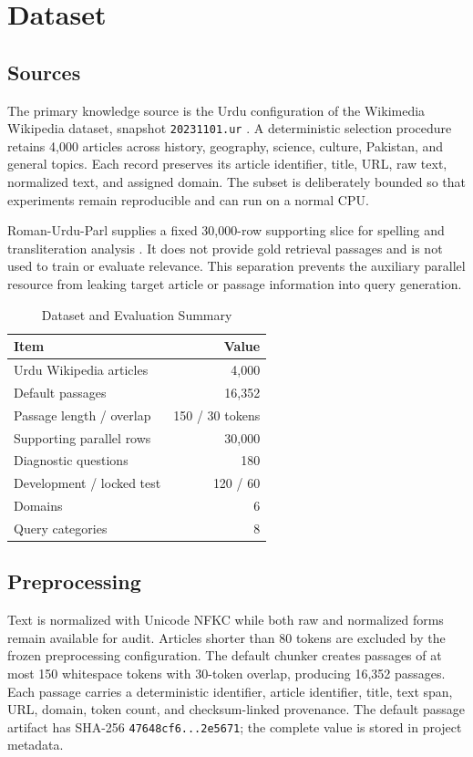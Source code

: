 \documentclass[conference]{IEEEtran}
\begin{document}
\section{Dataset}
\subsection{Sources}
The primary knowledge source is the Urdu configuration of the Wikimedia Wikipedia dataset, snapshot \texttt{20231101.ur} \cite{wikimedia2023urdu}. A deterministic selection procedure retains 4,000 articles across history, geography, science, culture, Pakistan, and general topics. Each record preserves its article identifier, title, URL, raw text, normalized text, and assigned domain. The subset is deliberately bounded so that experiments remain reproducible and can run on a normal CPU.

Roman-Urdu-Parl supplies a fixed 30,000-row supporting slice for spelling and transliteration analysis \cite{alam2022parallel}. It does not provide gold retrieval passages and is not used to train or evaluate relevance. This separation prevents the auxiliary parallel resource from leaking target article or passage information into query generation.

\begin{table}[t]
\caption{Dataset and Evaluation Summary}
\label{tab:data}
\centering
\small
\begin{tabular}{@{}lr@{}}
\toprule
Item & Value \\
\midrule
Urdu Wikipedia articles & 4,000 \\
Default passages & 16,352 \\
Passage length / overlap & 150 / 30 tokens \\
Supporting parallel rows & 30,000 \\
Diagnostic questions & 180 \\
Development / locked test & 120 / 60 \\
Domains & 6 \\
Query categories & 8 \\
\bottomrule
\end{tabular}
\end{table}

\subsection{Preprocessing}
Text is normalized with Unicode NFKC while both raw and normalized forms remain available for audit. Articles shorter than 80 tokens are excluded by the frozen preprocessing configuration. The default chunker creates passages of at most 150 whitespace tokens with 30-token overlap, producing 16,352 passages. Each passage carries a deterministic identifier, article identifier, title, text span, URL, domain, token count, and checksum-linked provenance. The default passage artifact has SHA-256 \texttt{47648cf6...2e5671}; the complete value is stored in project metadata.
\end{document}
